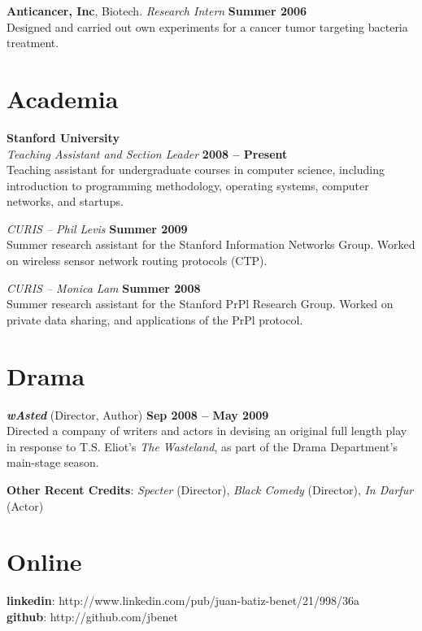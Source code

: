 \documentclass[margin,line]{resume}
\begin{document}
\begin{resume}
    \textbf{Anticancer, Inc}, Biotech.
      \textsl{Research Intern}
      \hfill \textbf{Summer 2006}\\
    Designed and carried out own experiments for a cancer tumor targeting
    bacteria treatment.

    \section{\mysidestyle Academia}

    \textbf{Stanford University} \vspace{2mm}\\%
    \textsl{Teaching Assistant and Section Leader} \hfill \textbf{2008 -- Present}\\
    Teaching assistant for undergraduate courses in computer science, including introduction to programming methodology, operating systems, computer networks, and startups.

    \textsl{CURIS -- Phil Levis} \hfill \textbf{Summer 2009}\\
    Summer research assistant for the Stanford Information Networks Group. Worked on wireless sensor network routing protocols (CTP).

    \textsl{CURIS -- Monica Lam} \hfill \textbf{Summer 2008}\\
    Summer research assistant for the Stanford PrPl Research Group. Worked on private data sharing, and applications of the PrPl protocol.


    \section{\mysidestyle Drama}
    \textbf{\emph{wAsted}} (Director, Author) \hfill \textbf{Sep 2008 -- May 2009} \\
    Directed a company of writers and actors in devising an original full length play in response to T.S. Eliot's \emph{The Wasteland}, as part of the Drama Department's main-stage season.

    \textbf{Other Recent Credits}: \emph{Specter} (Director), \emph{Black Comedy} (Director), \emph{In Darfur} (Actor) \emph{}



    \section{\mysidestyle Online}

    \textbf{linkedin}: http://www.linkedin.com/pub/juan-batiz-benet/21/998/36a
\\  \textbf{github}: http://github.com/jbenet


\end{resume}
\end{document}
